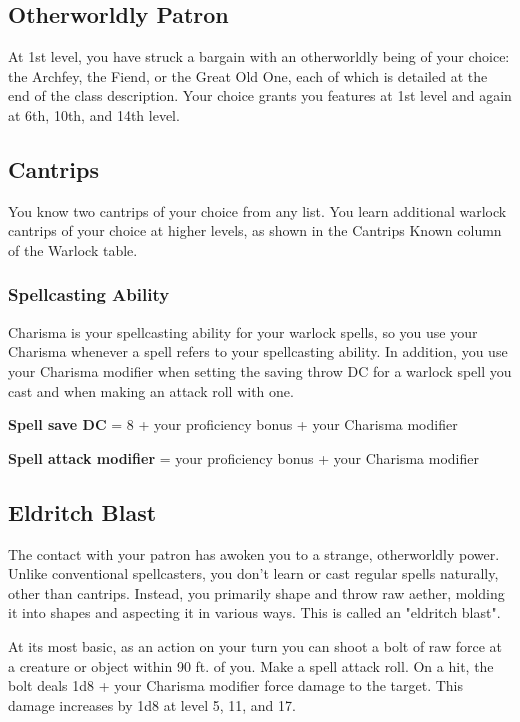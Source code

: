 \subsection{Otherworldly Patron}

At 1st level, you have struck a bargain with an otherworldly being of your choice: the Archfey, the Fiend, or the Great Old One, each of which is detailed at the end of the class description. Your choice grants you features at 1st level and again at 6th, 10th, and 14th level.

\subsection{Cantrips}

You know two cantrips of your choice from any list. You learn additional warlock cantrips of your choice at higher levels, as shown in the Cantrips Known column of the Warlock table.

\subsubsection{Spellcasting Ability}

Charisma is your spellcasting ability for your warlock spells, so you use your Charisma whenever a spell refers to your spellcasting ability. In addition, you use your Charisma modifier when setting the saving throw DC for a warlock spell you cast and when making an attack roll with one.

\textbf{Spell save DC} = 8 + your proficiency bonus + your Charisma modifier

\textbf{Spell attack modifier} = your proficiency bonus + your Charisma modifier

\subsection{Eldritch Blast}

The contact with your patron has awoken you to a strange, otherworldly power. Unlike conventional spellcasters, you don't learn or cast regular spells naturally, other than cantrips. Instead, you primarily shape and throw raw aether, molding it into shapes and aspecting it in various ways. This is called an "eldritch blast".

At its most basic, as an action on your turn you can shoot a bolt of raw force at a creature or object within 90 ft. of you. Make a spell attack roll. On a hit, the bolt deals 1d8 + your Charisma modifier force damage to the target. This damage increases by 1d8 at level 5, 11, and 17.

